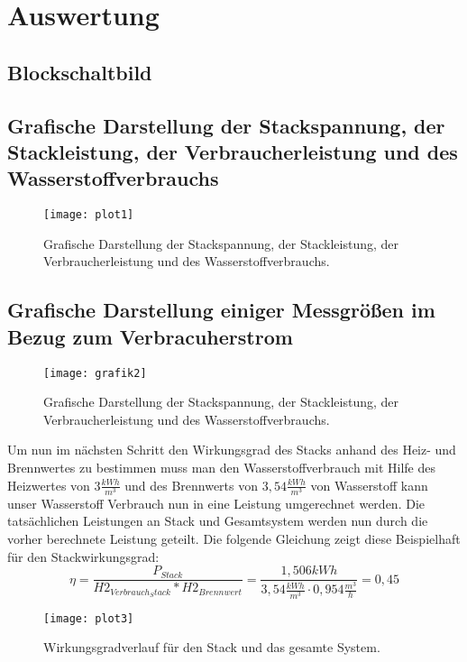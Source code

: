 \section{Auswertung}
\label{sec:Auswertung}


\subsection{Blockschaltbild}
\subsection{Grafische Darstellung der Stackspannung, der
Stackleistung, der Verbraucherleistung und des Wasserstoffverbrauchs}
\begin{figure}[H]
    \centering
    \texttt{[image: plot1]}
    \caption{Grafische Darstellung der Stackspannung, der
    Stackleistung, der Verbraucherleistung und des Wasserstoffverbrauchs.}
    \label{fig:plot1_26062023}
  \end{figure}
\subsection{Grafische Darstellung einiger Messgrößen im Bezug zum Verbracuherstrom}
\begin{figure}[H]
    \centering
    \texttt{[image: grafik2]}
    \caption{Grafische Darstellung der Stackspannung, der
    Stackleistung, der Verbraucherleistung und des Wasserstoffverbrauchs.}
    \label{fig:plot2_26062023}
  \end{figure}
  Um nun im nächsten Schritt den Wirkungsgrad des Stacks anhand des Heiz- und Brennwertes zu bestimmen muss man den Wasserstoffverbrauch mit Hilfe des Heizwertes von $3 \frac{kWh}{m^3}$ und des Brennwerts von $3,54 \frac{kWh}{m^3}$
von Wasserstoff kann unser Wasserstoff Verbrauch nun in eine Leistung umgerechnet werden. Die tatsächlichen Leistungen an Stack und Gesamtsystem werden nun durch die vorher berechnete Leistung geteilt. Die folgende Gleichung zeigt diese Beispielhaft für den Stackwirkungsgrad:
\begin{equation}
 \eta= \frac{P_{Stack}}{H2_{Verbrauch_Stack}*H2_{Brennwert}}= \frac{1,506 kWh}{3,54 \frac{kWh}{m^3 }\cdot 0,954 \frac{m^3}{h}}=0,45
  \label{eq:230627_Beispiel_wirkungsgrad_Berechnung}
\end{equation}
\begin{figure}[H]
    \centering
    \texttt{[image: plot3]}
    \caption{Wirkungsgradverlauf für den Stack und das gesamte System.}
    \label{fig:plot3_26062023}
  \end{figure}
